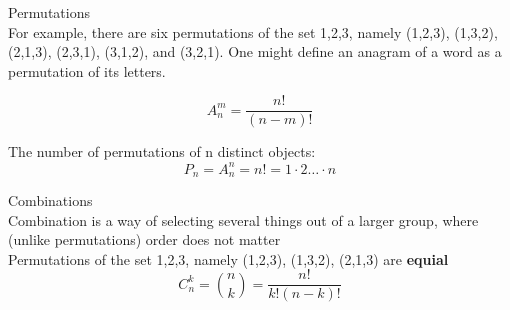 \documentclass{letter}
\begin{document}
Permutations \\

For example, there are six permutations of the set {1,2,3}, namely (1,2,3), (1,3,2), (2,1,3), (2,3,1), (3,1,2), and (3,2,1). One might define an anagram of a word as a permutation of its letters. 

$$
A_n^m=\frac{n!}{(n-m)!} 
$$

The number of permutations of n distinct objects: \\

$$
P_n=A_n^n=n!=1\cdot2  \dots \cdot n
$$

Combinations \\

Combination is a way of selecting several things out of a larger group, where (unlike permutations) order does not matter \\
Permutations of the set {1,2,3}, namely (1,2,3), (1,3,2), (2,1,3) are {\bfseries equial} \\

$$
C_n^k = {n\choose k} = \frac{n!}{k!\left(n-k\right)!}
$$
\end{document}
